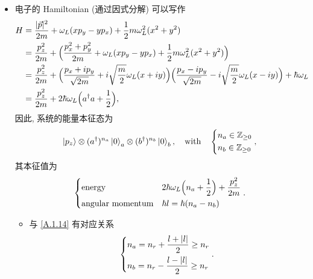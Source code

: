 \begin{itemize}
	\item 电子的 Hamiltonian (通过因式分解) 可以写作
	\begin{align}
		H &= \frac{|\vec{p}|^2}{2 m} + \omega_L (x p_y - y p_x) + \frac{1}{2} m \omega_L^2 (x^2 + y^2) \notag \\
		&= \frac{p_z^2}{2 m} + \Big( \frac{p_x^2 + p_y^2}{2 m} + \omega_L (x p_y - y p_x) + \frac{1}{2} m \omega_L^2 (x^2 + y^2) \Big) \notag \\
		&= \frac{p_z^2}{2 m} + \Big( \frac{p_x + i p_y}{\sqrt{2 m}} + i \sqrt{\frac{m}{2}} \omega_L (x + i y) \Big) \Big( \frac{p_x - i p_y}{\sqrt{2 m}} - i \sqrt{\frac{m}{2}} \omega_L (x - i y) \Big) + \hbar \omega_L \notag \\
		&= \frac{p_z^2}{2 m} + 2 \hbar \omega_L \Big( a^\dag a + \frac{1}{2} \Big),
	\end{align}
	因此, 系统的能量本征态为
	\begin{equation}
		\ket{p_z} \otimes (a^\dag)^{n_a} \ket{0}_a \otimes (b^\dag)^{n_b} \ket{0}_b, \quad \text{with} \quad \begin{dcases}
			n_a \in \mathbb{Z}_{\geq 0} \\
			n_b \in \mathbb{Z}_{\geq 0}
		\end{dcases},
	\end{equation}
	其本征值为
	\begin{equation}
		\begin{dcases}
			\text{energy} & 2 \hbar \omega_L \Big( n_a + \frac{1}{2} \Big) + \frac{p_z^2}{2 m} \\
			\text{angular momentum} & \hbar l = \hbar (n_a - n_b)
		\end{dcases}.
	\end{equation}
	\begin{itemize}
		\item 与 \eqref{A.1.14} 有对应关系
		\begin{equation}
			\begin{dcases}
				n_a = n_r + \frac{l + |l|}{2} \geq n_r \\
				n_b = n_r - \frac{l - |l|}{2} \geq n_r
			\end{dcases}.
		\end{equation}
	\end{itemize}
\end{itemize}

